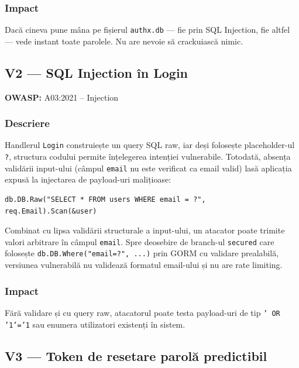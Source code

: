 \documentclass[12pt]{article}
\begin{document}
\subsubsection*{Impact}

Dacă cineva pune mâna pe fișierul \texttt{authx.db} --- fie prin SQL Injection, fie
altfel --- vede instant toate parolele. Nu are nevoie să crackuiască nimic.

\subsection{V2 --- SQL Injection în Login}

\textbf{OWASP:} A03:2021 -- Injection

\subsubsection*{Descriere}

Handlerul \texttt{Login} construiește un query SQL raw, iar deși folosește placeholder-ul
\texttt{?}, structura codului permite înțelegerea intenției vulnerabile. Totodată,
absența validării input-ului (câmpul \texttt{email} nu este verificat ca email valid)
lasă aplicația expusă la injectarea de payload-uri malițioase:

\begin{verbatim}
db.DB.Raw("SELECT * FROM users WHERE email = ?", req.Email).Scan(&user)
\end{verbatim}

Combinat cu lipsa validării structurale a input-ului, un atacator poate trimite
valori arbitrare în câmpul \texttt{email}. Spre deosebire de branch-ul \texttt{secured}
care folosește \texttt{db.DB.Where("email=?", ...)} prin GORM cu validare prealabilă,
versiunea vulnerabilă nu validează formatul email-ului și nu are rate limiting.

\subsubsection*{Impact}

Fără validare și cu query raw, atacatorul poate testa payload-uri de tip
\texttt{' OR '1'='1} sau enumera utilizatori existenți în sistem.

\subsection{V3 --- Token de resetare parolă predictibil}
\end{document}
